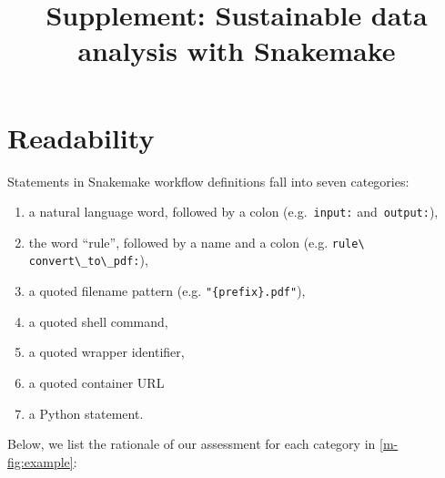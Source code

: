 \documentclass{scrartcl}
\begin{document}
\title{Supplement: Sustainable data analysis with Snakemake}
\maketitle

\section{Readability}\label{sec:readability}
Statements in Snakemake workflow definitions fall into seven categories:
\begin{enumerate}
	\item a natural language word, followed by a colon (e.g.~\lstinline!input:! and~\lstinline!output:!),
	\item the word ``rule'', followed by a name and a colon (e.g. \lstinline!rule\ convert\_to\_pdf:!),
	\item a quoted filename pattern (e.g. \lstinline!"{prefix}.pdf"!),
	\item a quoted shell command,
	\item a quoted wrapper identifier,
	\item a quoted container URL
	\item a Python statement.
\end{enumerate}

Below, we list the rationale of our assessment for each category in \autoref{m-fig:example}: 
\end{document}
